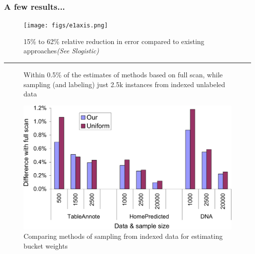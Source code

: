 \documentclass[11pt]{beamer}
\begin{document}
\begin{frame}
\frametitle{A few results...}


\begin{center}
\begin{figure}
\begin{minipage}[b]{0.45\linewidth}
\begin{center}
\texttt{[image: figs/e1axis.png]}
\end{center}
\end{minipage}
\hspace{2mm}
\begin{minipage}[b]{0.45\linewidth}
15\% to 62\% relative reduction in error compared to existing \linebreak approaches\textit{(See Slogistic)} \\ \vspace{1cm}
\end{minipage}
\end{figure}
\hrule
\begin{figure}
\begin{minipage}[b]{0.45\linewidth}
Within 0.5\% of the estimates of methods based on full scan, while sampling (and labeling) just 2.5k instances from indexed unlabeled data \\
\end{minipage}
\hspace{2mm}
\begin{minipage}[b]{0.45\linewidth}
\begin{center}
\includegraphics[width=\hsize]{figs/allDataWts-crop}
\caption{\tiny{Comparing methods of sampling from indexed data for
  estimating bucket weights}}
\end{center}  
\end{minipage}
\end{figure}
\end{center}

\end{frame}
\end{document}
